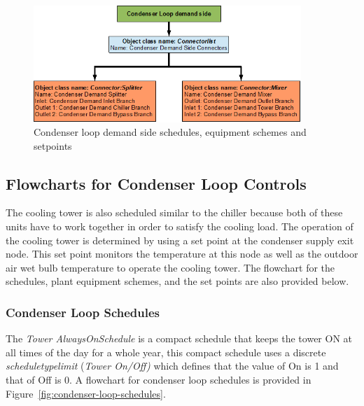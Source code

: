\begin{figure}[hbtp] %
\centering
\includegraphics[width=0.9\textwidth, height=0.9\textheight, keepaspectratio=true]{media/image036.png}
\caption{Condenser loop demand side schedules, equipment schemes and setpoints \protect \label{fig:condenser-loop-demand-side-schedules}}
\end{figure}

\subsection{Flowcharts for Condenser Loop Controls}\label{flowcharts-for-condenser-loop-controls-001}

The cooling tower is also scheduled similar to the chiller because both of these units have to work together in order to satisfy the cooling load. The operation of the cooling tower is determined by using a set point at the condenser supply exit node. This set point monitors the temperature at this node as well as the outdoor air wet bulb temperature to operate the cooling tower. The flowchart for the schedules, plant equipment schemes, and the set points are also provided below.

\subsubsection{Condenser Loop Schedules}\label{condenser-loop-schedules-001}

The \emph{Tower AlwaysOnSchedule} is a compact schedule that keeps the tower ON at all times of the day for a whole year, this compact schedule uses a discrete \emph{scheduletypelimit} (\emph{Tower On/Off)} which defines that the value of On is 1 and that of Off is 0. A flowchart for condenser loop schedules is provided in Figure~\ref{fig:condenser-loop-schedules}.

\emph{~}

